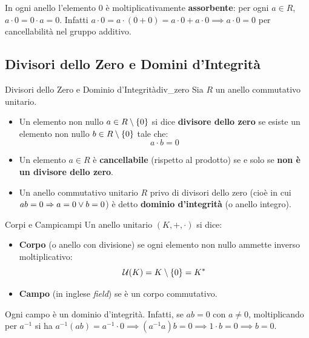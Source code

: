 In ogni anello l'elemento $0$ è moltiplicativamente \textbf{assorbente}: per ogni $a \in R$, $a \cdot 0 = 0 \cdot a = 0$. Infatti $a \cdot 0 = a \cdot (0 + 0) = a \cdot 0 + a \cdot 0 \implies a \cdot 0 = 0$ per cancellabilità nel gruppo additivo.

\subsection{Divisori dello Zero e Domini d'Integrità}

\begin{definizione}{Divisori dello Zero e Dominio d'Integrità}{div_zero}
Sia $R$ un anello commutativo unitario.
\begin{itemize}
    \item Un elemento non nullo $a \in R \setminus \{0\}$ si dice \textbf{divisore dello zero} se esiste un elemento non nullo $b \in R \setminus \{0\}$ tale che:
    \[
        a \cdot b = 0
    \]
    \item Un elemento $a \in R$ è \textbf{cancellabile} (rispetto al prodotto) se e solo se \textbf{non è un divisore dello zero}.
    \item Un anello commutativo unitario $R$ privo di divisori dello zero (cioè in cui $ab = 0 \Rightarrow a = 0 \vee b = 0$) è detto \textbf{dominio d'integrità} (o anello integro).
\end{itemize}
\end{definizione}

\begin{definizione}{Corpi e Campi}{campi}
Un anello unitario $(K, +, \cdot)$ si dice:
\begin{itemize}
    \item \textbf{Corpo} (o anello con divisione) se ogni elemento non nullo ammette inverso moltiplicativo:
    \[
        \mathcal{U}(K) = K \setminus \{0\} = K^*
    \]
    \item \textbf{Campo} (in inglese \emph{field}) se è un corpo commutativo.
\end{itemize}
\end{definizione}

Ogni campo è un dominio d'integrità. Infatti, se $ab = 0$ con $a \neq 0$, moltiplicando per $a^{-1}$ si ha $a^{-1}(ab) = a^{-1} \cdot 0 \implies (a^{-1}a)b = 0 \implies 1 \cdot b = 0 \implies b = 0$.

